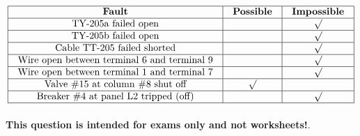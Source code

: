 






$$\vbox{\offinterlineskip
\halign{\strut
\vrule \quad\hfil # \ \hfil & 
\vrule \quad\hfil # \ \hfil & 
\vrule \quad\hfil # \ \hfil \vrule \cr
\noalign{\hrule}
%
{\bf Fault} & {\bf Possible} & {\bf Impossible} \cr
%
\noalign{\hrule}
%
TY-205a failed open &  & $\surd$ \cr
%
\noalign{\hrule}
%
TY-205b failed open &  & $\surd$ \cr
%
\noalign{\hrule}
%
Cable TT-205 failed shorted &  & $\surd$ \cr
%
\noalign{\hrule}
%
Wire open between terminal 6 and terminal 9 &  & $\surd$ \cr
%
\noalign{\hrule}
%
Wire open between terminal 1 and terminal 7 &  & $\surd$ \cr
%
\noalign{\hrule}
%
Valve \#15 at column \#8 shut off & $\surd$ &  \cr
%
\noalign{\hrule}
%
Breaker \#4 at panel L2 tripped (off) &  & $\surd$ \cr
%
\noalign{\hrule}
} %
}$$ %








{\bf This question is intended for exams only and not worksheets!}.



